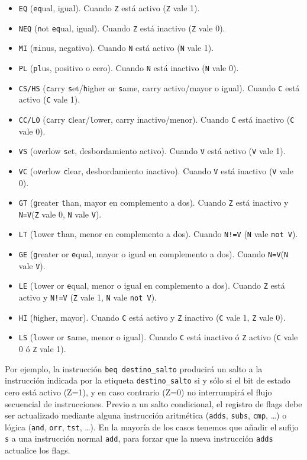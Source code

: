 \begin{itemize}
  \item{\tt EQ} ({\tt eq}ual, igual). Cuando {\tt Z} está activo ({\tt Z} vale 1).
  \item{\tt NEQ} ({\tt n}ot {\tt eq}ual, igual). Cuando {\tt Z} está inactivo ({\tt Z} vale 0).
  \item{\tt MI} ({\tt mi}nus, negativo). Cuando {\tt N} está activo ({\tt N} vale 1).
  \item{\tt PL} ({\tt pl}us, positivo o cero). Cuando {\tt N} está inactivo ({\tt N} vale 0).
  \item{\tt CS/HS} ({\tt c}arry {\tt s}et/{\tt h}igher or {\tt s}ame, carry activo/mayor o igual). Cuando {\tt C} está activo ({\tt C} vale 1).
  \item{\tt CC/LO} ({\tt c}arry {\tt c}lear/{\tt l}ower, carry inactivo/menor). Cuando {\tt C} está inactivo ({\tt C} vale 0).
  \item{\tt VS} (o{\tt v}erlow {\tt s}et, desbordamiento activo). Cuando {\tt V} está activo ({\tt V} vale 1).
  \item{\tt VC} (o{\tt v}erlow {\tt c}lear, desbordamiento inactivo). Cuando {\tt V} está inactivo ({\tt V} vale 0).
  \item{\tt GT} ({\tt g}reater {\tt t}han, mayor en complemento a dos). Cuando {\tt Z} está inactivo y {\tt N=V}({\tt Z} vale 0, {\tt N} vale {\tt V}).
  \item{\tt LT} ({\tt l}ower {\tt t}han, menor en complemento a dos). Cuando {\tt N!=V} ({\tt N} vale {\tt not V}).
  \item{\tt GE} ({\tt g}reater or {\tt e}qual, mayor o igual en complemento a dos). Cuando {\tt N=V}({\tt N} vale {\tt V}).
  \item{\tt LE} ({\tt l}ower or {\tt e}qual, menor o igual en complemento a dos). Cuando {\tt Z} está activo y {\tt N!=V} ({\tt Z} vale 1, {\tt N} vale {\tt not V}).
  \item{\tt HI} ({\tt h}igher, mayor). Cuando {\tt C} está activo y {\tt Z} inactivo ({\tt C} vale 1, {\tt Z} vale 0).
  \item{\tt LS} ({\tt l}ower or {\tt s}ame, menor o igual). Cuando {\tt C} está inactivo ó {\tt Z} activo ({\tt C} vale 0 ó {\tt Z} vale 1).
\end{itemize}

Por ejemplo, la instrucción {\tt beq destino\_salto} producirá un salto
a la instrucción indicada por la etiqueta {\tt destino\_salto} si y sólo
si el bit de estado cero está activo (Z=1), y en caso contrario
(Z=0) no interrumpirá el flujo secuencial de instrucciones.
Previo a un salto condicional, el registro de flags debe ser actualizado
mediante alguna instrucción aritmética ({\tt adds}, {\tt subs}, {\tt cmp},
\dots) o lógica ({\tt and}, {\tt orr}, {\tt tst}, \dots). En la mayoría
de los casos tenemos que añadir el sufijo {\tt s} a una instrucción normal
{\tt add}, para forzar que la nueva instrucción {\tt adds} actualice los flags.

